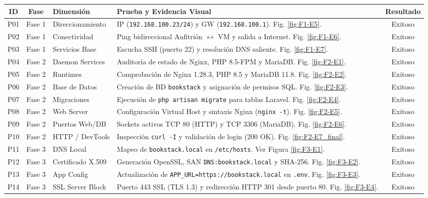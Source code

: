 \documentclass[12pt,a4paper]{article}
\begin{document}
\begin{table}[h!]
\centering
\small
\begin{tabular}{|c|c|p{2.8cm}|p{6.6cm}|c|}
\hline
\textbf{ID} & \textbf{Fase} & \textbf{Dimensión} & \textbf{Prueba y Evidencia Visual} & \textbf{Resultado} \\ \hline
P01 & Fase 1 & Direccionamiento & IP (\texttt{192.168.100.23/24}) y GW (\texttt{192.168.100.1}). Fig. \ref{fig:F1-E5}. & Exitoso \\ \hline
P02 & Fase 1 & Conectividad & Ping bidireccional Anfitrión $\leftrightarrow$ VM y salida a Internet. Fig. \ref{fig:F1-E6}. & Exitoso \\ \hline
P03 & Fase 1 & Servicios Base & Escucha SSH (puerto 22) y resolución DNS saliente. Fig. \ref{fig:F1-E7}. & Exitoso \\ \hline
P04 & Fase 2 & Daemon Services & Auditoría de estado de Nginx, PHP 8.5-FPM y MariaDB. Fig. \ref{fig:F2-E1}. & Exitoso \\ \hline
P05 & Fase 2 & Runtimes & Comprobación de Nginx 1.28.3, PHP 8.5 y MariaDB 11.8. Fig. \ref{fig:F2-E2}. & Exitoso \\ \hline
P06 & Fase 2 & Base de Datos & Creación de BD \texttt{bookstack} y asignación de permisos SQL. Fig. \ref{fig:F2-E3}. & Exitoso \\ \hline
P07 & Fase 2 & Migraciones & Ejecución de \texttt{php artisan migrate} para tablas Laravel. Fig. \ref{fig:F2-E4}. & Exitoso \\ \hline
P08 & Fase 2 & Web Server & Configuración Virtual Host y sintaxis Nginx (\texttt{nginx -t}). Fig. \ref{fig:F2-E5}. & Exitoso \\ \hline
P09 & Fase 2 & Puertos Web/DB & Sockets activos TCP 80 (HTTP) y TCP 3306 (MariaDB). Fig. \ref{fig:F2-E6}. & Exitoso \\ \hline
P10 & Fase 2 & HTTP / DevTools & Inspección \texttt{curl -I} y validación de login (200 OK). Fig. \ref{fig:F2-E7_final}. & Exitoso \\ \hline
P11 & Fase 3 & DNS Local & Mapeo de \texttt{bookstack.local} en \texttt{/etc/hosts}. Ver Figura \ref{fig:F3-E1}. & Exitoso \\ \hline
P12 & Fase 3 & Certificado X.509 & Generación OpenSSL, SAN \texttt{DNS:bookstack.local} y SHA-256. Fig. \ref{fig:F3-E2}. & Exitoso \\ \hline
P13 & Fase 3 & App Config & Actualización de \texttt{APP\_URL=https://bookstack.local} en \texttt{.env}. Fig. \ref{fig:F3-E3}. & Exitoso \\ \hline
P14 & Fase 3 & SSL Server Block & Puerto 443 SSL (TLS 1.3) y redirección HTTP 301 desde puerto 80. Fig. \ref{fig:F3-E4}. & Exitoso \\ \hline

\end{tabular}
\end{table}
\end{document}
